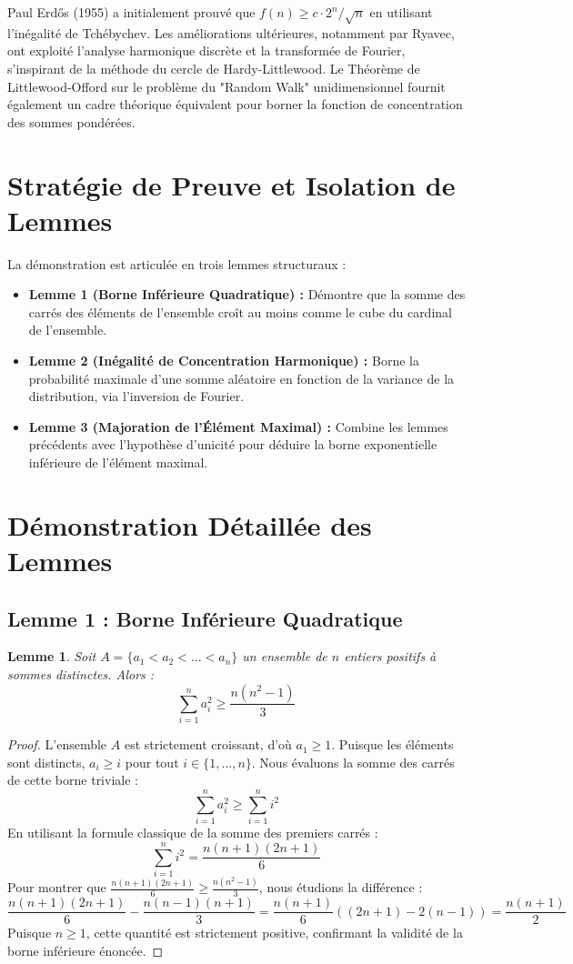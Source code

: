 \documentclass[12pt,a4paper]{article}
\newtheorem{lemma}{Lemme}[theorem]
\begin{document}
Paul Erdős (1955) a initialement prouvé que $f(n) \geq c \cdot 2^n / \sqrt{n}$ en utilisant l'inégalité de Tchébychev. Les améliorations ultérieures, notamment par Ryavec, ont exploité l'analyse harmonique discrète et la transformée de Fourier, s'inspirant de la méthode du cercle de Hardy-Littlewood. Le Théorème de Littlewood-Offord sur le problème du "Random Walk" unidimensionnel fournit également un cadre théorique équivalent pour borner la fonction de concentration des sommes pondérées.

\section{Stratégie de Preuve et Isolation de Lemmes}

La démonstration est articulée en trois lemmes structuraux :

\begin{itemize}
    \item \textbf{Lemme 1 (Borne Inférieure Quadratique) :} Démontre que la somme des carrés des éléments de l'ensemble croît au moins comme le cube du cardinal de l'ensemble.
    \item \textbf{Lemme 2 (Inégalité de Concentration Harmonique) :} Borne la probabilité maximale d'une somme aléatoire en fonction de la variance de la distribution, via l'inversion de Fourier.
    \item \textbf{Lemme 3 (Majoration de l'Élément Maximal) :} Combine les lemmes précédents avec l'hypothèse d'unicité pour déduire la borne exponentielle inférieure de l'élément maximal.
\end{itemize}

\section{Démonstration Détaillée des Lemmes}

\subsection{Lemme 1 : Borne Inférieure Quadratique}
\begin{lemma}
Soit $A = \{a_1 < a_2 < \dots < a_n\}$ un ensemble de $n$ entiers positifs à sommes distinctes. Alors :
$$ \sum_{i=1}^n a_i^2 \geq \frac{n(n^2-1)}{3} $$
\end{lemma}

\begin{proof}
L'ensemble $A$ est strictement croissant, d'où $a_1 \ge 1$. Puisque les éléments sont distincts, $a_i \ge i$ pour tout $i \in \{1, \dots, n\}$.
Nous évaluons la somme des carrés de cette borne triviale :
$$ \sum_{i=1}^n a_i^2 \ge \sum_{i=1}^n i^2 $$
En utilisant la formule classique de la somme des premiers carrés :
$$ \sum_{i=1}^n i^2 = \frac{n(n+1)(2n+1)}{6} $$
Pour montrer que $\frac{n(n+1)(2n+1)}{6} \geq \frac{n(n^2-1)}{3}$, nous étudions la différence :
$$ \frac{n(n+1)(2n+1)}{6} - \frac{n(n-1)(n+1)}{3} = \frac{n(n+1)}{6} \left( (2n+1) - 2(n-1) \right) = \frac{n(n+1)}{2} $$
Puisque $n \ge 1$, cette quantité est strictement positive, confirmant la validité de la borne inférieure énoncée.
\end{proof}
\end{document}
